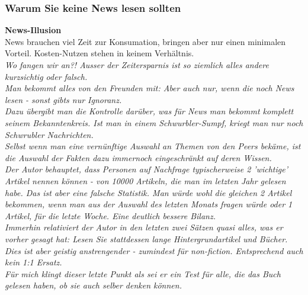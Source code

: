 \documentclass[a4paper, twocolumn]{article}
\begin{document}
\subsubsection*{Warum Sie keine News lesen sollten}
\textbf{News-Illusion}\\
News brauchen viel Zeit zur Konsumation, bringen aber nur einen minimalen Vorteil. Kosten-Nutzen stehen in keinem Verhältnis.\\
\textit{Wo fangen wir an?! Ausser der Zeitersparnis ist so ziemlich alles andere kurzsichtig oder falsch.\\
Man bekommt alles von den Freunden mit: Aber auch nur, wenn die noch News lesen - sonst gibts nur Ignoranz.\\
Dazu übergibt man die Kontrolle darüber, was für News man bekommt komplett seinem Bekanntenkreis. Ist man in einem Schwurbler-Sumpf, kriegt man nur noch Schwrubler Nachrichten.\\
Selbst wenn man eine vernünftige Auswahl an Themen von den Peers bekäme, ist die Auswahl der Fakten dazu immernoch eingeschränkt auf deren Wissen.\\
Der Autor behauptet, dass Personen auf Nachfrage typischerweise 2 'wichtige' Artikel nennen können - von 10000 Artikeln, die man im letzten Jahr gelesen habe. Das ist aber eine falsche Statistik. Man würde wohl die gleichen 2 Artikel bekommen, wenn man aus der Auswahl des letzten Monats fragen würde oder 1 Artikel, für die letzte Woche. Eine deutlich bessere Bilanz.\\
Immerhin relativiert der Autor in den letzten zwei Sätzen quasi alles, was er vorher gesagt hat: Lesen Sie stattdessen lange Hintergrundartikel und Bücher. Dies ist aber geistig anstrengender - zumindest für non-fiction. Entsprechend auch kein 1:1 Ersatz.\\
Für mich klingt dieser letzte Punkt als sei er ein Test für alle, die das Buch gelesen haben, ob sie auch selber denken können.}
\end{document}
